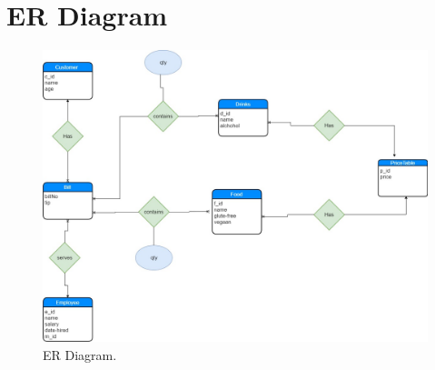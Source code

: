 \documentclass[dvips,12pt]{article}
\begin{document}
 






\FloatBarrier
\section{ER Diagram}
\begin{figure}
  \includegraphics[width=\linewidth]{Bar-ER-Diagram.jpg}
  \caption{ER Diagram.}
  \label{fig:er1}
\end{figure}
\FloatBarrier
\end{document}
